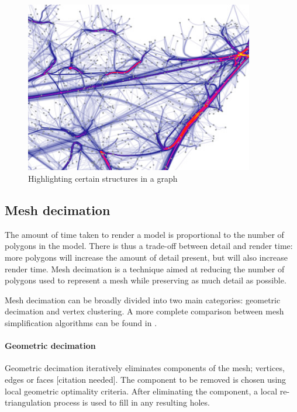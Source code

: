 \begin{figure}[h!]
  \begin{center}
    \includegraphics[width=100mm]{graph_highlight}
  \end{center}
  \caption{Highlighting certain structures in a graph}
  \label{fig:background_highlight}
\end{figure}


\subsection{Mesh decimation}
\label{sub:background_decimation}

The amount of time taken to render a model is proportional to the number of
polygons in the model.  There is thus a trade-off between detail and render
time: more polygons will increase the amount of detail present, but will also
increase render time.  Mesh decimation is a technique aimed at reducing the
number of polygons used to represent a mesh while preserving as much detail as
possible.

Mesh decimation can be broadly divided into two main categories: geometric
decimation and vertex clustering. A more complete comparison between mesh
simplification algorithms can be found in \citet{cignoni98}.

\paragraph{Geometric decimation}

Geometric decimation iteratively eliminates components of the mesh; vertices,
edges or faces [citation needed]. The component to be removed is chosen using
local geometric optimality criteria. After eliminating the component, a local
re-triangulation process is used to fill in any resulting holes.

